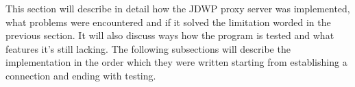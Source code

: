 \documentclass[..thesis.tex]{subfiles}
\begin{document}
This section will describe in detail how the JDWP proxy server was implemented, what problems were encountered and if it solved the limitation worded in the previous section.
It will also discuss ways how the program is tested and what features it's still lacking.
The following subsections will describe the implementation in the order which they were written starting from establishing a connection and ending with testing.
\end{document}
